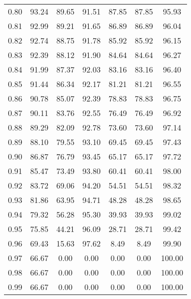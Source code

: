 \begin{tabular}{|c|c|c|c|c|c|c|}
      0.80 &     93.24 &     89.65 &      91.51 &   87.85 &      87.85 &         95.93 \\
      0.81 &     92.99 &     89.21 &      91.65 &   86.89 &      86.89 &         96.04 \\
      0.82 &     92.74 &     88.75 &      91.78 &   85.92 &      85.92 &         96.15 \\
      0.83 &     92.39 &     88.12 &      91.90 &   84.64 &      84.64 &         96.27 \\
      0.84 &     91.99 &     87.37 &      92.03 &   83.16 &      83.16 &         96.40 \\
      0.85 &     91.44 &     86.34 &      92.17 &   81.21 &      81.21 &         96.55 \\
      0.86 &     90.78 &     85.07 &      92.39 &   78.83 &      78.83 &         96.75 \\
      0.87 &     90.11 &     83.76 &      92.55 &   76.49 &      76.49 &         96.92 \\
      0.88 &     89.29 &     82.09 &      92.78 &   73.60 &      73.60 &         97.14 \\
      0.89 &     88.10 &     79.55 &      93.10 &   69.45 &      69.45 &         97.43 \\
      0.90 &     86.87 &     76.79 &      93.45 &   65.17 &      65.17 &         97.72 \\
      0.91 &     85.47 &     73.49 &      93.80 &   60.41 &      60.41 &         98.00 \\
      0.92 &     83.72 &     69.06 &      94.20 &   54.51 &      54.51 &         98.32 \\
      0.93 &     81.86 &     63.95 &      94.71 &   48.28 &      48.28 &         98.65 \\
      0.94 &     79.32 &     56.28 &      95.30 &   39.93 &      39.93 &         99.02 \\
      0.95 &     75.85 &     44.21 &      96.09 &   28.71 &      28.71 &         99.42 \\
      0.96 &     69.43 &     15.63 &      97.62 &    8.49 &       8.49 &         99.90 \\
      0.97 &     66.67 &      0.00 &       0.00 &    0.00 &       0.00 &        100.00 \\
      0.98 &     66.67 &      0.00 &       0.00 &    0.00 &       0.00 &        100.00 \\
      0.99 &     66.67 &      0.00 &       0.00 &    0.00 &       0.00 &        100.00 \\
\bottomrule
\end{tabular}

